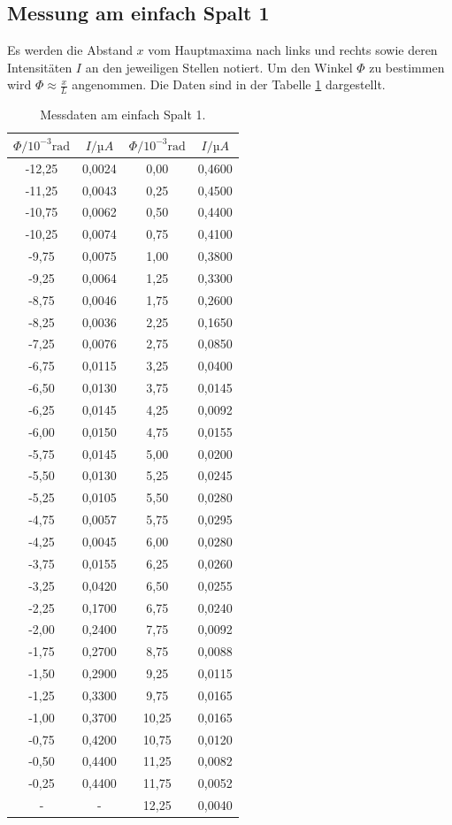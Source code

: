 \subsection{Messung am einfach Spalt 1}
Es werden die Abstand $x$ vom Hauptmaxima nach links und rechts sowie deren Intensitäten $I$
an den jeweiligen Stellen notiert. Um den Winkel $\Phi$ zu bestimmen wird $\Phi \approx \frac{x}{L}$
angenommen.
Die Daten sind in der Tabelle \ref{tab:1} dargestellt.
\begin{table}[H]
  \centering
  \caption{Messdaten am einfach Spalt 1.}
  \label{tab:1}
  \begin{tabular}{c c c c}
    \toprule
    $\Phi / 10^{-3}\text{rad}$ & $I / µA $ &$\Phi / 10^{-3}\text{rad}$ & $I / µA$\\
    \midrule
    -12,25& 0,0024 & 0,00 & 0,4600\\
    -11,25& 0,0043 & 0,25 & 0,4500\\
    -10,75& 0,0062 & 0,50 & 0,4400\\
    -10,25& 0,0074 & 0,75 & 0,4100\\
    -9,75 & 0,0075 & 1,00 & 0,3800\\
    -9,25 & 0,0064 & 1,25 & 0,3300\\
    -8,75 & 0,0046 & 1,75 & 0,2600\\
    -8,25 & 0,0036 & 2,25 & 0,1650\\
    -7,25 & 0,0076 & 2,75 & 0,0850\\
    -6,75 & 0,0115 & 3,25 & 0,0400\\
    -6,50 & 0,0130 & 3,75 & 0,0145\\
    -6,25 & 0,0145 & 4,25 & 0,0092\\
    -6,00 & 0,0150 & 4,75 & 0,0155\\
    -5,75 & 0,0145 & 5,00 & 0,0200\\
    -5,50 & 0,0130 & 5,25 & 0,0245\\
    -5,25 & 0,0105 & 5,50 & 0,0280\\
    -4,75 & 0,0057 & 5,75 & 0,0295\\
    -4,25 & 0,0045 & 6,00 & 0,0280\\
    -3,75 & 0,0155 & 6,25 & 0,0260\\
    -3,25 & 0,0420 & 6,50 & 0,0255\\
    -2,25 & 0,1700 & 6,75 & 0,0240\\
    -2,00 & 0,2400 & 7,75 & 0,0092\\
    -1,75 & 0,2700 & 8,75 & 0,0088\\
    -1,50 & 0,2900 & 9,25 & 0,0115\\
    -1,25 & 0,3300 & 9,75 & 0,0165\\
    -1,00 & 0,3700 & 10,25& 0,0165\\
    -0,75 & 0,4200 & 10,75& 0,0120\\
    -0,50 & 0,4400 & 11,25& 0,0082\\
    -0,25 & 0,4400 & 11,75& 0,0052\\
        - &     -  & 12,25& 0,0040\\
    \midrule
    \bottomrule
  \end{tabular}
\end{table}

